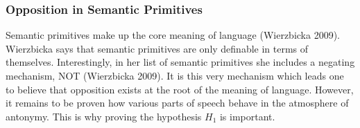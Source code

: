 \subsubsection {Opposition in Semantic Primitives} 
Semantic primitives make up the core meaning of language (Wierzbicka 2009).  Wierzbicka says that semantic primitives are only definable in terms of themselves.  Interestingly, in her list of semantic primitives she includes a negating mechanism, NOT (Wierzbicka 2009).  It is this very mechanism which leads one to believe that opposition exists at the root of the meaning of language.  However, it remains to be proven how various parts of speech behave in the atmosphere of antonymy.  This is why proving the hypothesis $H_{1}$ is important.

